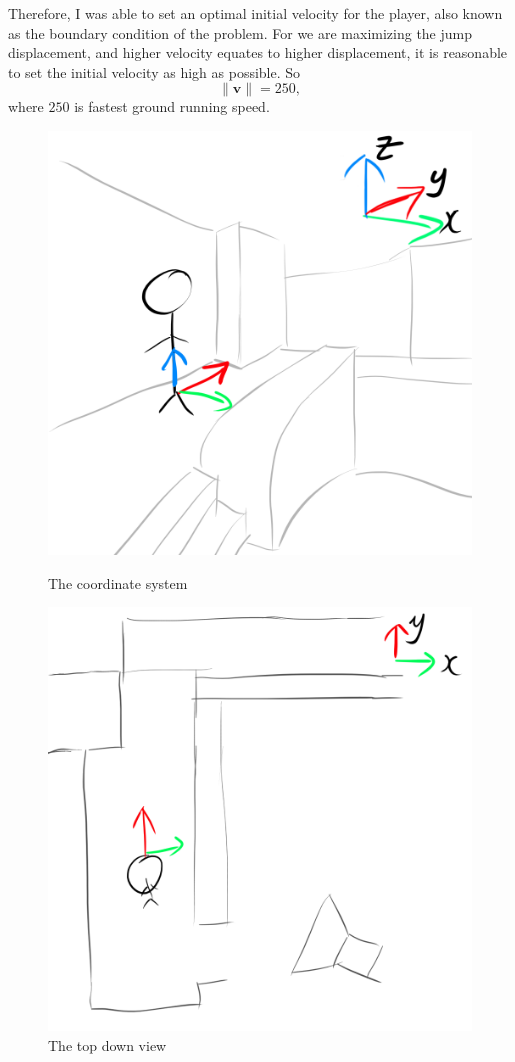 \documentclass[a4paper,12pt]{article}
\newcommand{\tvec}[1]{\boldsymbol{#1}}
\newcommand{\tmag}[1]{\|#1\|}
\newcommand{\tv}{\tvec{v}}
\begin{document}
Therefore, I was able to set an optimal initial velocity for the player, also known as the boundary condition of the problem. For we are maximizing the jump displacement, and higher velocity equates to higher displacement, it is reasonable to set the initial velocity as high as possible. So
\[
    \tmag{\tv} = 250,
\]
where $250$ is fastest ground running speed.


\begin{figure}[H]
    \centering
    \begin{minipage}{.5\textwidth}
        \centering
        \includegraphics[width=0.9\linewidth]{assets/1coordinates.png}
        \caption{The coordinate system}
        \label{fig:1coordinates}
    \end{minipage}%
    \begin{minipage}{.5\textwidth}
        \centering
        \includegraphics[width=0.9\linewidth]{assets/2coordinate_topdown.png}
        \caption{The top down view}
        \label{fig:2coordinates_topdown}
    \end{minipage}
\end{figure}
\end{document}
